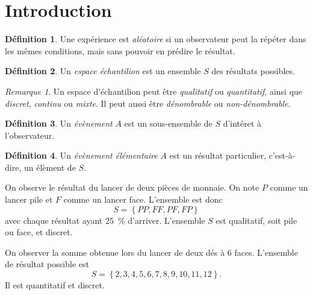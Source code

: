 \documentclass[11pt]{article}
\makeatletter
\theoremstyle{remark}
\newtheorem*{remark}{Remarque}
\theoremstyle{definition}
\newtheorem*{@definition}{Définition}
\newenvironment{definition}{%
	\begin{@definition}%
}{%
	\end{@definition}%
	\setcounter{property}{0}%
}
\makeatother
\begin{document}


\tableofcontents

\pagebreak
\section{Introduction}
\begin{definition}
	Une expérience est \textit{aléatoire} si un observateur peut la répéter
	dans les mêmes conditions, mais sans pouvoir en prédire le résultat.
\end{definition}

\begin{definition}
	Un \textit{espace échantilion} est un ensemble $S$ des résultats possibles.
\end{definition}

\begin{remark}
	Un espace d'échantilion peut être \textit{qualitatif} ou
	\textit{quantitatif}, ainsi que \textit{discret}, \textit{continu} ou
	\textit{mixte}. Il peut aussi être \textit{dénombrable} ou
	\textit{non-dénombrable}.
\end{remark}

\begin{definition}
	Un \textit{évènement} $A$ est un sous-ensemble de $S$ d'intêret à
	l'observateur.
\end{definition}

\begin{definition}
	Un \textit{évènement élémentaire} $A$ est un résultat particulier,
	c'est-à-dire, un élèment de $S$.
\end{definition}

\begin{exemple}
	On observe le résultat du lancer de deux pièces de monnaie. On note $P$
	comme un lancer pile et $F$ comme un lancer face. L'ensemble est donc
	\begin{equation*}
		S=\left\{PP, FF, PF, FP\right\}
	\end{equation*}
	avec chaque résultat ayant \SI{25}{\percent} d'arriver. L'ensemble $S$ est
	qualitatif, soit pile ou face, et discret.
\end{exemple}

\begin{exemple}
	On observer la somme obtenue lors du lancer de deux dés à 6 faces.
	L'ensemble de résultat possible est
	\begin{equation*}
		S=\left\{2,3,4,5,6,7,8,9,10,11,12\right\}.
	\end{equation*}
	Il est quantitatif et discret.
\end{exemple}
\end{document}
